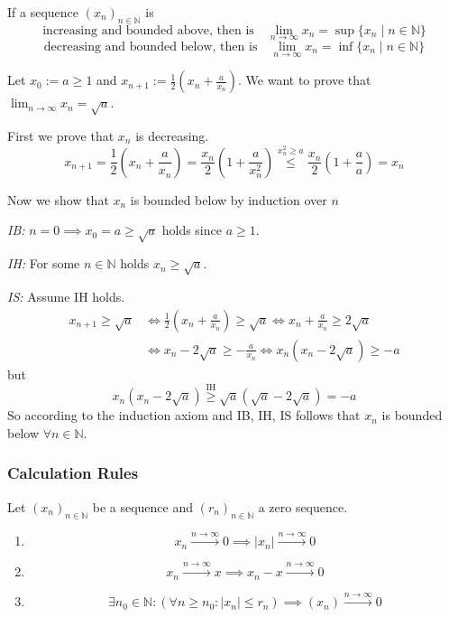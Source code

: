 \begin{theorem}\label{thm:incr_bound_conv}
   If a sequence \((x_n)_{n \in \mathbb{N}}\) is
   \[\text{increasing and bounded above, then is} \quad \lim_{n \to \infty} x_n = \sup\{x_n \mid n \in \mathbb{N}\}\]
   \[\text{decreasing and bounded below, then is} \quad \lim_{n \to \infty} x_n = \inf\{x_n \mid n \in \mathbb{N}\}\]
\end{theorem}
\begin{example}
   Let \(x_0 := a \geq 1\) and \(x_{n+1} := \frac{1}{2} \left(x_n + \frac{a}{x_n}\right)\).
   We want to prove that \(\lim_{n \to \infty} x_n = \sqrt{a}\).

   First we prove that \(x_n\) is decreasing.
   \[x_{n+1} = \frac{1}{2} \left(x_n + \frac{a}{x_n}\right) = \frac{x_n}{2} \left(1 + \frac{a}{x_n^2}\right) \overset{x_n^2 \geq a}{\leq} \frac{x_n}{2} \left(1 + \frac{a}{a}\right) = x_n\]

   Now we show that \(x_n\) is bounded below by induction over \(n\)

   \textit{IB:} \(n = 0 \implies x_0 = a \geq \sqrt{a}\) holds since \(a \geq 1\).

   \textit{IH:} For some \(n \in \mathbb{N}\) holds \(x_n \geq \sqrt{a}\).

   \textit{IS:} Assume IH holds.
   \begin{equation*}
      \begin{split}
         x_{n+1} \geq \sqrt{a} & \iff \frac{1}{2} \left(x_n + \frac{a}{x_n}\right) \geq \sqrt{a} \iff x_n + \frac{a}{x_n} \geq 2 \sqrt{a}\\
                               & \iff x_n - 2\sqrt{a} \geq - \frac{a}{x_n} \iff x_n(x_n - 2\sqrt{a}) \geq -a
      \end{split}
   \end{equation*}
   but
   \[x_n(x_n - 2 \sqrt{a}) \overset{\text{IH}}{\geq} \sqrt{a}(\sqrt{a} - 2 \sqrt{a}) = -a\]
   So according to the induction axiom and IB, IH, IS follows that \(x_n\) is bounded below \(\forall n \in \mathbb{N}\).
\end{example}

\subsubsection{Calculation Rules}
\begin{lemma}\label{lem:zero_seq}
   Let \((x_n)_{n \in \mathbb{N}}\) be a sequence and \((r_n)_{n \in \mathbb{N}}\) a zero sequence.
   \begin{enumerate}[label=\roman*, align=Center]
      \item \[x_n \xrightarrow{n \to \infty} 0 \implies |x_n| \xrightarrow{n \to \infty} 0\]
      \item \[x_n \xrightarrow{n \to \infty} x \implies x_n - x \xrightarrow{n \to \infty} 0\]
      \item \[\exists n_0 \in \mathbb{N}: (\forall n \geq n_0: |x_n| \leq r_n) \implies (x_n) \xrightarrow{n \to \infty} 0\]
   \end{enumerate}
\end{lemma}

